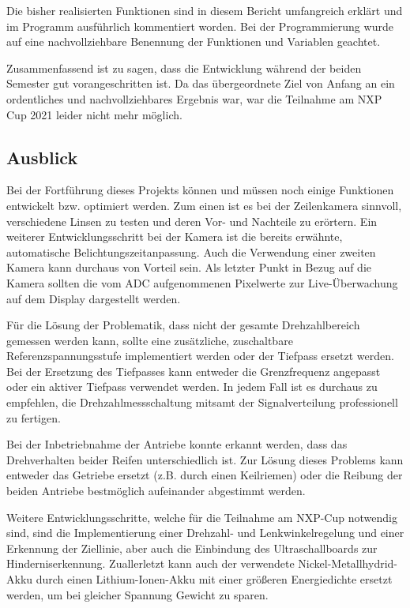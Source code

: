 Die bisher realisierten Funktionen sind in diesem Bericht umfangreich erklärt und im Programm ausführlich kommentiert worden. Bei der Programmierung wurde auf eine nachvollziehbare Benennung der Funktionen und Variablen geachtet.\vspace{11pt}

Zusammenfassend ist zu sagen, dass die Entwicklung während der beiden Semester gut vorangeschritten ist. Da das übergeordnete Ziel von Anfang an ein ordentliches und nachvollziehbares Ergebnis war, war die Teilnahme am NXP Cup 2021 leider nicht mehr möglich.

\newpage
\subsection{Ausblick}\label{Sec11Sub2}

Bei der Fortführung dieses Projekts können und müssen noch einige Funktionen entwickelt bzw. optimiert werden. Zum einen ist es bei der Zeilenkamera sinnvoll, verschiedene Linsen zu testen und deren Vor- und Nachteile zu erörtern. Ein weiterer Entwicklungsschritt bei der Kamera ist die bereits erwähnte, automatische Belichtungszeitanpassung. Auch die Verwendung einer zweiten Kamera kann durchaus von Vorteil sein. Als letzter Punkt in Bezug auf die Kamera sollten die vom ADC aufgenommenen Pixelwerte zur Live-Überwachung auf dem Display dargestellt werden.\vspace{11pt}

Für die Lösung der Problematik, dass nicht der gesamte Drehzahlbereich gemessen werden kann, sollte eine zusätzliche, zuschaltbare Referenzspannungsstufe implementiert werden oder der Tiefpass ersetzt werden. Bei der Ersetzung des Tiefpasses kann entweder die Grenzfrequenz angepasst oder ein aktiver Tiefpass verwendet werden. In jedem Fall ist es durchaus zu empfehlen, die Drehzahlmessschaltung mitsamt der Signalverteilung professionell zu fertigen.\vspace{11pt}

Bei der Inbetriebnahme der Antriebe konnte erkannt werden, dass das Drehverhalten beider Reifen unterschiedlich ist. Zur Lösung dieses Problems kann entweder das Getriebe ersetzt (z.B. durch einen Keilriemen) oder die Reibung der beiden Antriebe bestmöglich aufeinander abgestimmt werden.\vspace{11pt}

Weitere Entwicklungsschritte, welche für die Teilnahme am NXP-Cup notwendig sind, sind die Implementierung einer Drehzahl- und Lenkwinkelregelung und einer Erkennung der Ziellinie, aber auch die Einbindung des Ultraschallboards zur Hinderniserkennung. Zuallerletzt kann auch der verwendete Nickel-Metallhydrid-Akku durch einen Lithium-Ionen-Akku mit einer größeren Energiedichte ersetzt werden, um bei gleicher Spannung Gewicht zu sparen.


\newpage
